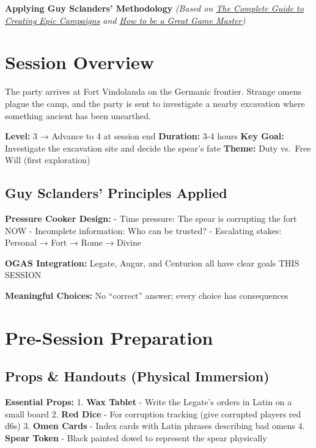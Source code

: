 \documentclass[
]{book}
\begin{document}
\textbf{Applying Guy Sclanders' Methodology} \emph{(Based on
\href{https://books.google.com/books/about/The_Complete_Guide_to_Creating_Epic_Camp.html?id=0XFNvgEACAAJ}{The
Complete Guide to Creating Epic Campaigns} and
\href{https://www.greatgamemaster.com/dm/about-us/}{How to be a Great
Game Master})}

\section{Session Overview}\label{session-overview}

The party arrives at Fort Vindolanda on the Germanic frontier. Strange
omens plague the camp, and the party is sent to investigate a nearby
excavation where something ancient has been unearthed.

\textbf{Level:} 3 → Advance to 4 at session end \textbf{Duration:} 3-4
hours \textbf{Key Goal:} Investigate the excavation site and decide the
spear's fate \textbf{Theme:} Duty vs.~Free Will (first exploration)

\subsection{Guy Sclanders' Principles
Applied}\label{guy-sclanders-principles-applied}

\textbf{Pressure Cooker Design:} - Time pressure: The spear is
corrupting the fort NOW - Incomplete information: Who can be trusted? -
Escalating stakes: Personal → Fort → Rome → Divine

\textbf{OGAS Integration:} Legate, Augur, and Centurion all have clear
goals THIS SESSION

\textbf{Meaningful Choices:} No ``correct'' answer; every choice has
consequences

\section{Pre-Session Preparation}\label{pre-session-preparation}

\subsection{Props \& Handouts (Physical
Immersion)}\label{props-handouts-physical-immersion}

\textbf{Essential Props:} 1. \textbf{Wax Tablet} - Write the Legate's
orders in Latin on a small board 2. \textbf{Red Dice} - For corruption
tracking (give corrupted players red d6s) 3. \textbf{Omen Cards} - Index
cards with Latin phrases describing bad omens 4. \textbf{Spear Token} -
Black painted dowel to represent the spear physically
\end{document}
